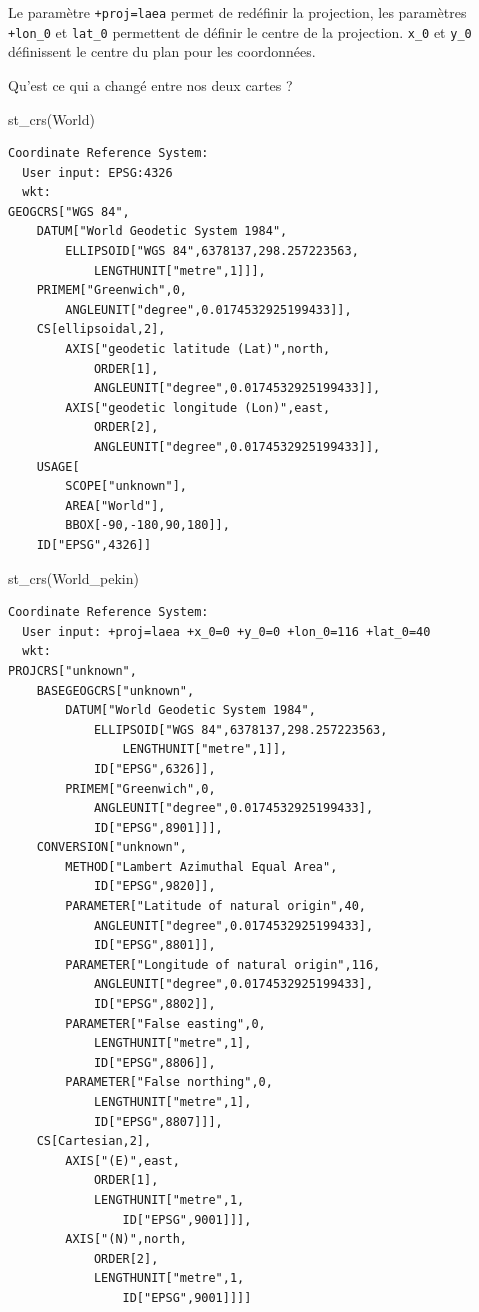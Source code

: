 \documentclass[
]{book}
\newenvironment{Shaded}{\begin{snugshade}}{\end{snugshade}}
\newcommand{\FunctionTok}[1]{\textcolor[rgb]{0.00,0.00,0.00}{#1}}
\newcommand{\NormalTok}[1]{#1}
\begin{document}
Le paramètre \texttt{+proj=laea} permet de redéfinir la projection, les paramètres \texttt{+lon\_0} et \texttt{lat\_0} permettent de définir le centre de la projection. \texttt{x\_0} et \texttt{y\_0} définissent le centre du plan pour les coordonnées.

Qu'est ce qui a changé entre nos deux cartes ?

\begin{Shaded}
\begin{Highlighting}[]
\FunctionTok{st\_crs}\NormalTok{(World)}
\end{Highlighting}
\end{Shaded}

\begin{verbatim}
Coordinate Reference System:
  User input: EPSG:4326 
  wkt:
GEOGCRS["WGS 84",
    DATUM["World Geodetic System 1984",
        ELLIPSOID["WGS 84",6378137,298.257223563,
            LENGTHUNIT["metre",1]]],
    PRIMEM["Greenwich",0,
        ANGLEUNIT["degree",0.0174532925199433]],
    CS[ellipsoidal,2],
        AXIS["geodetic latitude (Lat)",north,
            ORDER[1],
            ANGLEUNIT["degree",0.0174532925199433]],
        AXIS["geodetic longitude (Lon)",east,
            ORDER[2],
            ANGLEUNIT["degree",0.0174532925199433]],
    USAGE[
        SCOPE["unknown"],
        AREA["World"],
        BBOX[-90,-180,90,180]],
    ID["EPSG",4326]]
\end{verbatim}

\begin{Shaded}
\begin{Highlighting}[]
\FunctionTok{st\_crs}\NormalTok{(World\_pekin)}
\end{Highlighting}
\end{Shaded}

\begin{verbatim}
Coordinate Reference System:
  User input: +proj=laea +x_0=0 +y_0=0 +lon_0=116 +lat_0=40 
  wkt:
PROJCRS["unknown",
    BASEGEOGCRS["unknown",
        DATUM["World Geodetic System 1984",
            ELLIPSOID["WGS 84",6378137,298.257223563,
                LENGTHUNIT["metre",1]],
            ID["EPSG",6326]],
        PRIMEM["Greenwich",0,
            ANGLEUNIT["degree",0.0174532925199433],
            ID["EPSG",8901]]],
    CONVERSION["unknown",
        METHOD["Lambert Azimuthal Equal Area",
            ID["EPSG",9820]],
        PARAMETER["Latitude of natural origin",40,
            ANGLEUNIT["degree",0.0174532925199433],
            ID["EPSG",8801]],
        PARAMETER["Longitude of natural origin",116,
            ANGLEUNIT["degree",0.0174532925199433],
            ID["EPSG",8802]],
        PARAMETER["False easting",0,
            LENGTHUNIT["metre",1],
            ID["EPSG",8806]],
        PARAMETER["False northing",0,
            LENGTHUNIT["metre",1],
            ID["EPSG",8807]]],
    CS[Cartesian,2],
        AXIS["(E)",east,
            ORDER[1],
            LENGTHUNIT["metre",1,
                ID["EPSG",9001]]],
        AXIS["(N)",north,
            ORDER[2],
            LENGTHUNIT["metre",1,
                ID["EPSG",9001]]]]
\end{verbatim}
\end{document}
